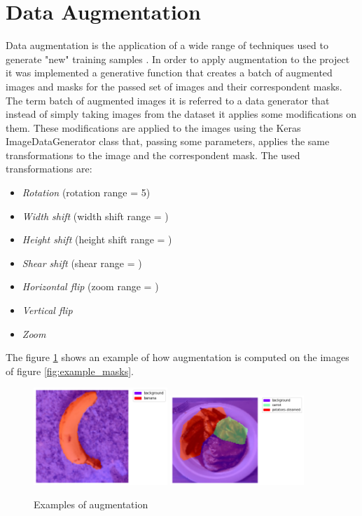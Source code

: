 \documentclass[a4paper,10pt]{report}
\begin{document}
\section{Data Augmentation}\label{sec:section-34}
Data augmentation is the application of a wide range of techniques used to generate "new" training samples \cite{augmentation}. In order to apply augmentation to the project it was implemented a generative function that creates a batch of augmented images and masks for the passed set of images and their correspondent masks.
The term batch of augmented images it is referred to a data generator that instead of simply taking images from the dataset it applies some modifications on them. These modifications are applied to the images using the Keras ImageDataGenerator class that, passing some parameters, applies the same transformations to the image and the correspondent mask.
The used transformations are:
\begin{itemize}
    \item \emph{Rotation} (rotation range = 5\textdegree)
    \item \emph{Width shift} (width shift range = )
    \item \emph{Height shift} (height shift range = )
    \item \emph{Shear shift} (shear range = )
    \item \emph{Horizontal flip} (zoom range = )
    \item \emph{Vertical flip}
    \item \emph{Zoom}
\end{itemize}

The figure \ref{fig:example_aug} shows an example of how augmentation is computed on the images of figure \ref{fig:example_masks}.

\begin{figure}[h]
    \centering
    \includegraphics[width=0.45\textwidth]{assets/img/banana_aug.png}
    \includegraphics[width=0.45\textwidth]{assets/img/potatoes_aug.png}
    \caption{Examples of augmentation}
    \label{fig:example_aug}
\end{figure}
\end{document}
